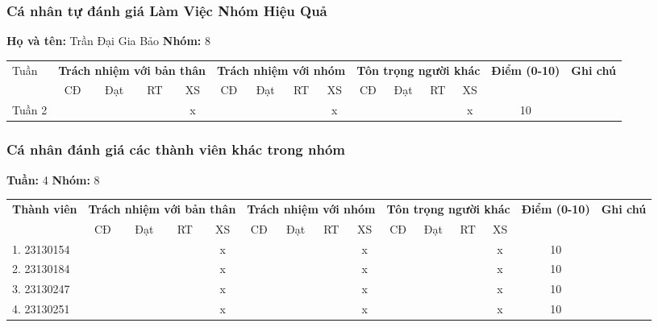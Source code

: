 \subsubsection*{Cá nhân tự đánh giá Làm Việc Nhóm Hiệu Quả}

\noindent \textbf{Họ và tên:} Trần Đại Gia Bảo \hrulefill \quad \textbf{Nhóm:} 8 \hrulefill

\vspace{0.5cm}

\begin{tabularx}{\linewidth}{|X|c|c|c|c|c|c|c|c|c|c|c|c|c|c|}
\hline
Tuần & \multicolumn{4}{c|}{\textbf{Trách nhiệm với bản thân}} & \multicolumn{4}{c|}{\textbf{Trách nhiệm với nhóm}} & \multicolumn{4}{c|}{\textbf{Tôn trọng người khác}} & \multirow{2}{1.5cm}{\textbf{Điểm (0-10)}} & \multirow{2}{1.5cm}{\textbf{Ghi chú}} \\ \cline{2-13}
 & CĐ & Đạt & RT & XS & CĐ & Đạt & RT & XS & CĐ & Đạt & RT & XS & & \\ \hline
  Tuần 2 & & & & x & & & & x & & & & x & 10 & \\ \hline
\end{tabularx}

\vspace{1cm}

\subsubsection*{Cá nhân đánh giá các thành viên khác trong nhóm}

\noindent \textbf{Tuần:} 4 \hrulefill \quad \textbf{Nhóm:} 8 \hrulefill

\vspace{0.5cm}

\begin{tabularx}{\linewidth}{|X|c|c|c|c|c|c|c|c|c|c|c|c|c|c|}
\hline
\multirow{2}{3cm}{\textbf{Thành viên}} & \multicolumn{4}{c|}{\textbf{Trách nhiệm với bản thân}} & \multicolumn{4}{c|}{\textbf{Trách nhiệm với nhóm}} & \multicolumn{4}{c|}{\textbf{Tôn trọng người khác}} & \multirow{2}{1.2cm}{\textbf{Điểm (0-10)}} & \multirow{2}{1.5cm}{\textbf{Ghi chú}} \\ \cline{2-13}
 & CĐ & Đạt & RT & XS & CĐ & Đạt & RT & XS & CĐ & Đạt & RT & XS & & \\ \hline
1. 23130154 & & & & x & & & & x & & & & x & 10 & \\ \hline
2. 23130184 & & & & x & & & & x & & & & x & 10 & \\ \hline
3. 23130247 & & & & x & & & & x & & & & x & 10 & \\ \hline
4. 23130251 & & & & x & & & & x & & & & x & 10 & \\ \hline
\end{tabularx}
